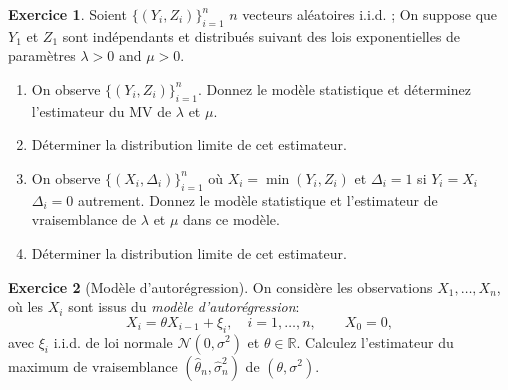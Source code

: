\documentclass[a4paper,11pt,fleqn]{article}
\newcommand{\R}{\ensuremath{\mathbb{R}}}
\theoremstyle{definition}
\newtheorem{exercice}{Exercice}
\begin{document}
\begin{exercice}
Soient $\{(Y_i,Z_i)\}_{i=1}^n$ $n$ vecteurs aléatoires i.i.d. ; On suppose que $Y_1$ et $Z_1$ sont indépendants et distribués suivant des lois exponentielles de paramètres $\lambda > 0$ and $\mu > 0$.
\begin{enumerate}
\item On  observe $\{(Y_i,Z_i) \}_{i=1}^n$. Donnez le modèle statistique et déterminez l'estimateur du MV de $\lambda$ et $\mu$.
\item Déterminer la distribution limite de cet estimateur.
\item On observe $\{(X_i,\Delta_i)\}_{i=1}^n$ où $X_i= \min(Y_i,Z_i)$ et $\Delta_i= 1$ si $Y_i = X_i$ $\Delta_i=0$ autrement. Donnez le modèle statistique et l'estimateur de vraisemblance de $\lambda$ et $\mu$ dans ce modèle.
\item Déterminer la distribution limite de cet estimateur.
\end{enumerate}
\end{exercice}

\begin{exercice}[Mod\`ele d'autor\'egression]

On consid\`ere les observations $X_1,\dots,X_n$, o\`u les $X_i$
sont issus du {\it mod\`ele d'autor\'egression}:
$$
X_i=\theta X_{i-1} + \xi_i, \quad i=1,\dots,n, \quad\quad X_0=0,
$$
avec $\xi_i$ i.i.d. de loi normale ${\mathcal N}(0,\sigma^2)$ et
$\theta\in \R$.
Calculez l'estimateur du maximum de vraisemblance  $(\hat \theta_n,\hat \sigma_{n}^2)$ de $(\theta,\sigma^2)$.


\end{exercice}
\end{document}
